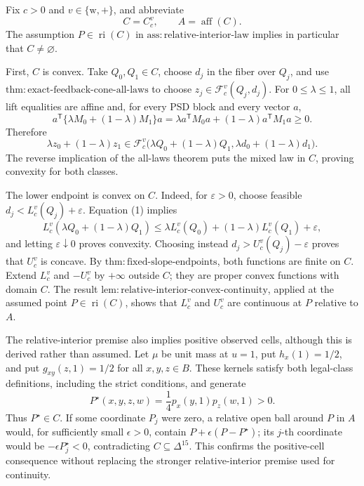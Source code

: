 Fix \(c>0\) and \(v\in\{\mathrm w,+\}\), and abbreviate
\[
 C=C_c^v,
 \qquad A=\operatorname{aff}(C).
\]
The assumption \(P\in\operatorname{ri}(C)\) in \(\mathrm{ass{:}relative\text{-}interior\text{-}law}\) implies in particular that \(C\ne\varnothing\).

First, \(C\) is convex.  Take \(Q_0,Q_1\in C\), choose \(d_j\) in the fiber over \(Q_j\), and use \(\mathrm{thm{:}exact\text{-}feedback\text{-}cone\text{-}all\text{-}laws}\) to choose \(z_j\in\mathcal F_c^v(Q_j,d_j)\).  For \(0\le\lambda\le1\), all lift equalities are affine and, for every PSD block and every vector \(a\),
\[
 a^{\mathsf T}\{\lambda M_0+(1-\lambda)M_1\}a
 =\lambda a^{\mathsf T}M_0a+(1-\lambda)a^{\mathsf T}M_1a\ge0.
\]
Therefore
\[
 \lambda z_0+(1-\lambda)z_1
 \in\mathcal F_c^v\bigl(\lambda Q_0+(1-\lambda)Q_1,
 \lambda d_0+(1-\lambda)d_1\bigr). \tag{1}
\]
The reverse implication of the all-laws theorem puts the mixed law in \(C\), proving convexity for both classes.

The lower endpoint is convex on \(C\).  Indeed, for \(\varepsilon>0\), choose feasible \(d_j<L_c^v(Q_j)+\varepsilon\).  Equation (1) implies
\[
 L_c^v(\lambda Q_0+(1-\lambda)Q_1)
 \le\lambda L_c^v(Q_0)+(1-\lambda)L_c^v(Q_1)+\varepsilon,
\]
and letting \(\varepsilon\downarrow0\) proves convexity.  Choosing instead \(d_j>U_c^v(Q_j)-\varepsilon\) proves that \(U_c^v\) is concave.  By \(\mathrm{thm{:}fixed\text{-}slope\text{-}endpoints}\), both functions are finite on \(C\).  Extend \(L_c^v\) and \(-U_c^v\) by \(+\infty\) outside \(C\); they are proper convex functions with domain \(C\).  The result \(\mathrm{lem{:}relative\text{-}interior\text{-}convex\text{-}continuity}\), applied at the assumed point \(P\in\operatorname{ri}(C)\), shows that \(L_c^v\) and \(U_c^v\) are continuous at \(P\) relative to \(A\).

The relative-interior premise also implies positive observed cells, although this is derived rather than assumed.  Let \(\mu\) be unit mass at \(u=1\), put \(h_x(1)=1/2\), and put \(g_{xy}(z,1)=1/2\) for all \(x,y,z\in B\).  These kernels satisfy both legal-class definitions, including the strict conditions, and generate
\[
 P^\star(x,y,z,w)=\frac14p_x(y,1)p_z(w,1)>0. \tag{2}
\]
Thus \(P^\star\in C\).  If some coordinate \(P_j\) were zero, a relative open ball around \(P\) in \(A\) would, for sufficiently small \(\epsilon>0\), contain \(P+\epsilon(P-P^\star)\); its \(j\)-th coordinate would be \(-\epsilon P_j^\star<0\), contradicting \(C\subseteq\Delta^{15}\).  This confirms the positive-cell consequence without replacing the stronger relative-interior premise used for continuity.

